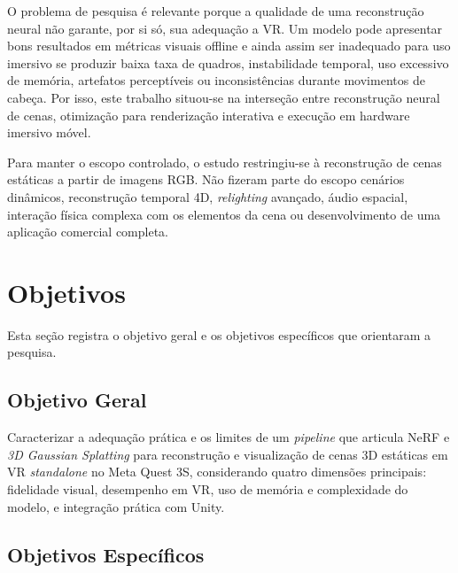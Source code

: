 O problema de pesquisa é relevante porque a qualidade de uma reconstrução neural não garante, por si só, sua adequação a VR. Um modelo pode apresentar bons resultados em métricas visuais offline e ainda assim ser inadequado para uso imersivo se produzir baixa taxa de quadros, instabilidade temporal, uso excessivo de memória, artefatos perceptíveis ou inconsistências durante movimentos de cabeça. Por isso, este trabalho situou-se na interseção entre reconstrução neural de cenas, otimização para renderização interativa e execução em hardware imersivo móvel.

Para manter o escopo controlado, o estudo restringiu-se à reconstrução de cenas estáticas a partir de imagens RGB. Não fizeram parte do escopo cenários dinâmicos, reconstrução temporal 4D, \textit{relighting} avançado, áudio espacial, interação física complexa com os elementos da cena ou desenvolvimento de uma aplicação comercial completa.

\section{Objetivos}

Esta seção registra o objetivo geral e os objetivos específicos que orientaram a pesquisa.

\subsection{Objetivo Geral}

Caracterizar a adequação prática e os limites de um \textit{pipeline} que articula NeRF e \textit{3D Gaussian Splatting} para reconstrução e visualização de cenas 3D estáticas em VR \textit{standalone} no Meta Quest 3S, considerando quatro dimensões principais: fidelidade visual, desempenho em VR, uso de memória e complexidade do modelo, e integração prática com Unity.

\subsection{Objetivos Específicos}

